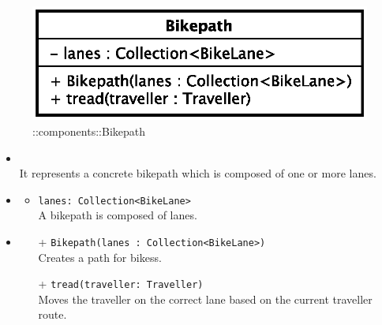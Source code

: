 \begin{figure}[h]
\centering
\includegraphics[scale=0.6,keepaspectratio]{images/solution/app/backend/bikepath.eps}
\caption{\pReactiveComponent::components::Bikepath}
\label{fig:sd-app-bikepath}
\end{figure}
\FloatBarrier
\begin{itemize}
  \item \textbf{\descr} \\
    It represents a concrete bikepath which is composed of one or more lanes.
  \item \textbf{\attrs}
  \begin{itemize}
    \item \texttt{lanes: Collection<BikeLane>} \\
A bikepath is composed of lanes.
  \end{itemize}
  \item \textbf{\ops}
  \begin{itemize}
  \item[+] \texttt{Bikepath(lanes : Collection<BikeLane>)} \\
    Creates a path for bikess.
    \item[+] \texttt{tread(traveller: Traveller)} \\
Moves the traveller on the correct lane based on the current traveller route. 
  \end{itemize}
\end{itemize}
